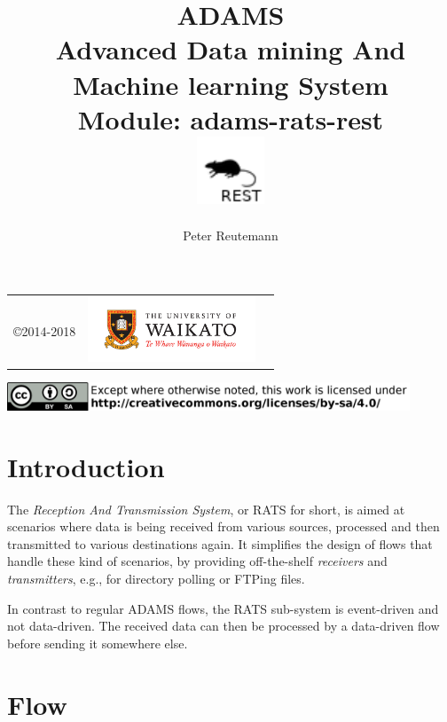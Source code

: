 \documentclass[a4paper]{book}
\title{
  \textbf{ADAMS} \\
  {\Large \textbf{A}dvanced \textbf{D}ata mining \textbf{A}nd \textbf{M}achine
  learning \textbf{S}ystem} \\
  {\Large Module: adams-rats-rest} \\
  \vspace{1cm}
  \includegraphics[width=2cm]{images/rats-rest-module.png} \\
}
\author{
  Peter Reutemann
}
\begin{document}
\begin{titlepage}
\maketitle

\thispagestyle{empty}
\center
\begin{table}[b]
	\begin{tabular}{c l l}
		\parbox[c][2cm]{2cm}{\copyright 2014-2018} &
		\parbox[c][2cm]{5cm}{\includegraphics[width=5cm]{images/coat_of_arms.pdf}}
	\end{tabular}
	\includegraphics[width=12cm]{images/cc.png} \\
\end{table}

\end{titlepage}

\tableofcontents

\chapter{Introduction}
The \textit{Reception And Transmission System}, or RATS for short, is aimed
at scenarios where data is being received from various sources, processed
and then transmitted to various destinations again. It simplifies the design
of flows that handle these kind of scenarios, by providing off-the-shelf
\textit{receivers} and \textit{transmitters}, e.g., for directory polling
or FTPing files.

In contrast to regular ADAMS flows, the RATS sub-system is event-driven
and not data-driven. The received data can then be processed by a data-driven
flow before sending it somewhere else.


\chapter{Flow}
\end{document}
